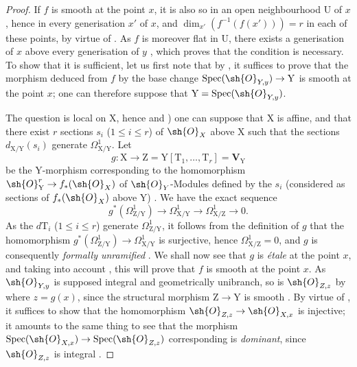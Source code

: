 \begin{proof}
If $f$ is smooth at the point $x$, it is also so in an open neighbourhood $\mathrm{U}$ of $x$, hence in every generisation $x'$ of $x$, and $\dim_{x'}(f^{-1}(f(x')))=r$ in each of these points, by virtue of .
As $f$ is moreover flat in $\mathrm{U}$, there exists a generisation of $x$ above every generisation of $y$ , which proves that the condition is necessary.
To show that it is sufficient, let us first note that by , it suffices to prove that the morphism deduced from $f$ by the base change $\operatorname{Spec}(\sh{O}_{Y,y})\to\mathrm{Y}$ is smooth at the point $x$; one can therefore suppose that $\mathrm{Y}=\operatorname{Spec}(\sh{O}_{Y,y})$.

The question is local on $\mathrm{X}$, hence  and ) one can suppose that $\mathrm{X}$ is affine, and that there exist $r$ sections $s_i$ ($1\leq i\leq r$) of $\sh{O}_X$ above $\mathrm{X}$ such that the sections $d_{\mathrm{X}/\mathrm{Y}}(s_i)$ generate $\Omega^1_{\mathrm{X}/\mathrm{Y}}$.
Let
\[
  g:\mathrm{X}\to\mathrm{Z}=\mathrm{Y}[\mathrm{T}_1,\ldots,\mathrm{T}_r]=\mathbf{V}_{\mathrm{Y}}
\]
be the $\mathrm{Y}$-morphism corresponding to the homomorphism $\sh{O}_{\mathrm{Y}}^r\to f_*(\sh{O}_X)$ of $\sh{O}_Y$-Modules defined by the $s_i$ (considered as sections of $f_*(\sh{O}_X)$ above $\mathrm{Y}$) .
We have the exact sequence
\[
  g^*(\Omega^1_{\mathrm{Z}/\mathrm{Y}})\to\Omega^1_{\mathrm{X}/\mathrm{Y}}\to\Omega^1_{\mathrm{X}/\mathrm{Z}}\to 0.
\]
As the $d\mathrm{T}_i$ ($1\leq i\leq r$) generate $\Omega^1_{\mathrm{Z}/\mathrm{Y}}$, it follows from the definition of $g$ that the homomorphism $g^*(\Omega^1_{\mathrm{Z}/\mathrm{Y}})\to\Omega^1_{\mathrm{X}/\mathrm{Y}}$ is surjective, hence $\Omega^1_{\mathrm{X}/\mathrm{Z}}=0$, and $g$ is consequently \emph{formally unramified} .
We shall now see that $g$ is \emph{\'etale} at the point $x$, and taking into account , this will prove that $f$ is smooth at the point $x$.
As $\sh{O}_{Y,y}$ is supposed integral and geometrically
unibranch, so is $\sh{O}_{Z,z}$ by  where $z=g(x)$, since the structural morphism $\mathrm{Z}\to\mathrm{Y}$ is smooth .
By virtue of , it suffices to show that the homomorphism $\sh{O}_{Z,z}\to\sh{O}_{X,x}$ is injective; it amounts to the same thing to see that the morphism $\operatorname{Spec}(\sh{O}_{X,x})\to\operatorname{Spec}(\sh{O}_{Z,z})$ corresponding is \emph{dominant}, since $\sh{O}_{Z,z}$ is integral .

\end{proof}
